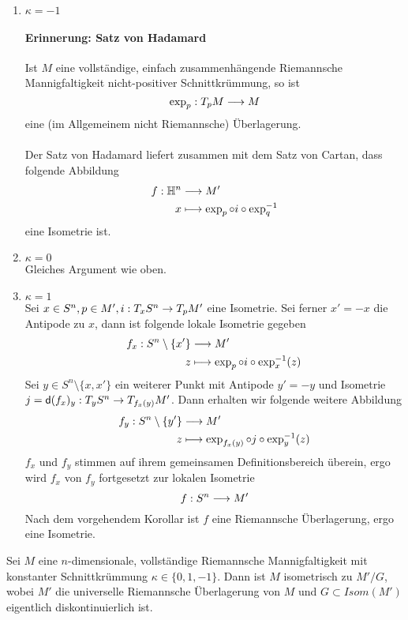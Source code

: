 \documentclass{book}
\renewcommand{\d}{\textsf{d}}
\begin{document}
\begin{Beweis}{}
\begin{enumerate}
\item $\kappa = -1$
\paragraph{Erinnerung: Satz von Hadamard}
Ist $M$ eine vollständige, einfach zusammenhängende Riemannsche Mannigfaltigkeit nicht-positiver Schnittkrümmung, so ist
\[ \exp_p : T_pM \overset{}{\longrightarrow} M \]
eine (im Allgemeinem nicht Riemannsche) Überlagerung.\\\\
Der Satz von Hadamard liefert zusammen mit dem Satz von Cartan, dass folgende Abbildung
\begin{align*}
f : \mathbb{H}^n & \overset{}{\longrightarrow} M'\\
x &\longmapsto \exp_p \circ i \circ \exp_q^{-1}
\end{align*}
eine Isometrie ist.

\item $\kappa = 0$\\
Gleiches Argument wie oben.

\item $\kappa = 1$\\
Sei $x \in S^n, p \in M', i:T_xS^n \overset{}{\rightarrow} T_pM'$ eine Isometrie. Sei ferner $x' = -x$ die Antipode zu $x$, dann ist folgende lokale Isometrie gegeben
\begin{align*}
f_x : S^n\setminus\{x'\} & \overset{}{\longrightarrow} M'\\
z & \longmapsto \exp_p \circ i \circ \exp_x^{-1}(z)
\end{align*}
Sei $y \in S^n\setminus\{x,x'\}$ ein weiterer Punkt mit Antipode $y' = -y$ und Isometrie $j = \d (f_x)_{y} : T_yS^n \pfeil{} T_{f_x(y)}M'$. Dann erhalten wir folgende weitere Abbildung
\begin{align*}
f_y : S^n\setminus\{y'\} & \overset{}{\longrightarrow} M'\\
z & \longmapsto \exp_{f_x(y)} \circ j \circ \exp_y^{-1}(z)
\end{align*}
$f_x$ und $f_y$ stimmen auf ihrem gemeinsamen Definitionsbereich überein, ergo wird $f_x$ von $f_y$ fortgesetzt zur lokalen Isometrie
\[ f: S^n \overset{}{\longrightarrow} M' \] 
Nach dem vorgehendem Korollar ist $f$ eine Riemannsche Überlagerung, ergo eine Isometrie.
\end{enumerate}
\end{Beweis}

\Kor{}
Sei $M$ eine $n$-dimensionale, vollständige Riemannsche Mannigfaltigkeit mit konstanter Schnittkrümmung $\kappa \in \{0,1,-1\}$. Dann ist $M$ isometrisch zu $M' / G$, wobei $M'$ die universelle Riemannsche Überlagerung von $M$ und $G \subset Isom(M')$ eigentlich diskontinuierlich ist.
\end{document}
